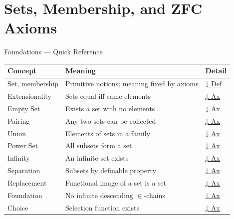 
\section{Sets, Membership, and ZFC Axioms}

\begin{toolkitbox}{Foundations — Quick Reference}
\small
\begin{tabular}{l l l}
\toprule
\textbf{Concept} & \textbf{Meaning} & \textbf{Detail} \\
\midrule
Set, membership        & Primitive notions; meaning fixed by axioms & \hyperref[def:set-membership]{↓ Def} \\
Extensionality         & Sets equal iff same elements & \hyperref[ax:extensionality]{↓ Ax} \\
Empty Set              & Exists a set with no elements & \hyperref[ax:empty-set]{↓ Ax} \\
Pairing                & Any two sets can be collected & \hyperref[ax:pairing]{↓ Ax} \\
Union                  & Elements of sets in a family & \hyperref[ax:union]{↓ Ax} \\
Power Set              & All subsets form a set & \hyperref[ax:power-set]{↓ Ax} \\
Infinity               & An infinite set exists & \hyperref[ax:infinity]{↓ Ax} \\
Separation             & Subsets by definable property & \hyperref[ax:separation]{↓ Ax} \\
Replacement            & Functional image of a set is a set & \hyperref[ax:replacement]{↓ Ax} \\
Foundation             & No infinite descending $\in$-chains & \hyperref[ax:foundation]{↓ Ax} \\
Choice                 & Selection function exists & \hyperref[ax:choice]{↓ Ax} \\
\bottomrule
\end{tabular}
\end{toolkitbox}


